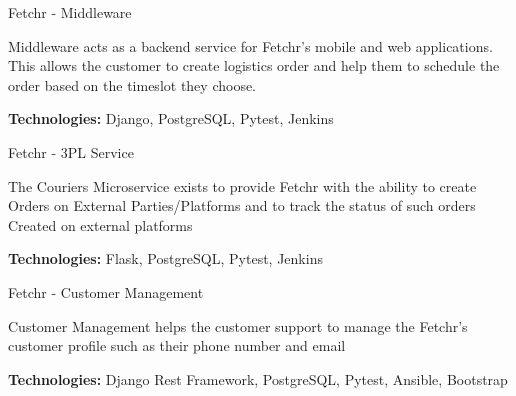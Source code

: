 \begin{cventries}
  \cventry
    {} %
    {Fetchr - Middleware} %
    {} %
    {} %
    {
      \begin{cvitems} %
        {Middleware acts as a backend service for Fetchr's mobile and web applications. This allows the customer to create logistics order and help them to schedule the order based on the timeslot they choose.}
        \item {\textbf{Technologies:} Django, PostgreSQL, Pytest, Jenkins}
      \end{cvitems}
    }

\cventry
    {} %
    {Fetchr - 3PL Service} %
    {} %
    {} %
    {
      \begin{cvitems} %
        {The Couriers Microservice exists to provide Fetchr with the ability to create Orders on External Parties/Platforms and to track the status of such orders Created on external platforms}
        \item {\textbf{Technologies:} Flask, PostgreSQL, Pytest, Jenkins}
      \end{cvitems}
}
\cventry
    {} %
    {Fetchr - Customer Management} %
    {} %
    {} %
    {
      \begin{cvitems} %
        {Customer Management helps the customer support to manage the Fetchr's customer profile
        such as their phone number and email}
        \item {\textbf{Technologies:} Django Rest Framework, PostgreSQL, Pytest, Ansible, Bootstrap }
      \end{cvitems}
    }

\end{cventries}
